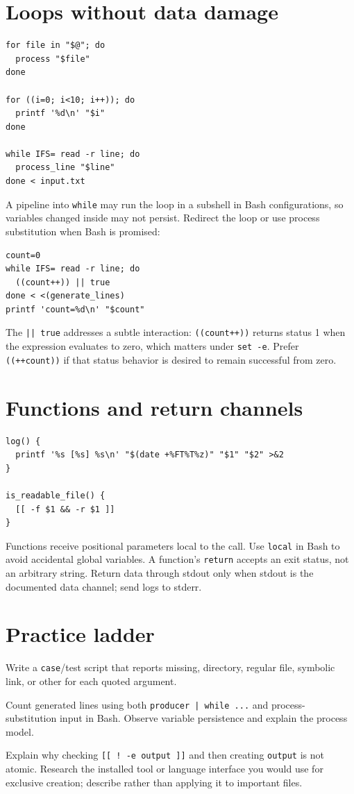 \documentclass[11pt,oneside,openany]{book}
\begin{document}
\section{Loops without data damage}
\begin{lstlisting}
for file in "$@"; do
  process "$file"
done

for ((i=0; i<10; i++)); do
  printf '%d\n' "$i"
done

while IFS= read -r line; do
  process_line "$line"
done < input.txt
\end{lstlisting}
A pipeline into \texttt{while} may run the loop in a subshell in Bash configurations, so variables changed inside may not persist. Redirect the loop or use process substitution when Bash is promised:
\begin{lstlisting}
count=0
while IFS= read -r line; do
  ((count++)) || true
done < <(generate_lines)
printf 'count=%d\n' "$count"
\end{lstlisting}
The \texttt{|| true} addresses a subtle interaction: \texttt{((count++))} returns status 1 when the expression evaluates to zero, which matters under \texttt{set -e}. Prefer \texttt{((++count))} if that status behavior is desired to remain successful from zero.

\section{Functions and return channels}
\begin{lstlisting}
log() {
  printf '%s [%s] %s\n' "$(date +%FT%T%z)" "$1" "$2" >&2
}

is_readable_file() {
  [[ -f $1 && -r $1 ]]
}
\end{lstlisting}
Functions receive positional parameters local to the call. Use \texttt{local} in Bash to avoid accidental global variables. A function's \texttt{return} accepts an exit status, not an arbitrary string. Return data through stdout only when stdout is the documented data channel; send logs to stderr.

\section{Practice ladder}
\begin{practicebox}[title={Easy -- classify paths}]
Write a \texttt{case}/test script that reports missing, directory, regular file, symbolic link, or other for each quoted argument.
\end{practicebox}
\begin{practicebox}[title={Medium -- loop persistence}]
Count generated lines using both \texttt{producer | while ...} and process-substitution input in Bash. Observe variable persistence and explain the process model.
\end{practicebox}
\begin{practicebox}[title={Hard -- time-of-check race}]
Explain why checking \texttt{[[ ! -e output ]]} and then creating \texttt{output} is not atomic. Research the installed tool or language interface you would use for exclusive creation; describe rather than applying it to important files.
\end{practicebox}
\end{document}
